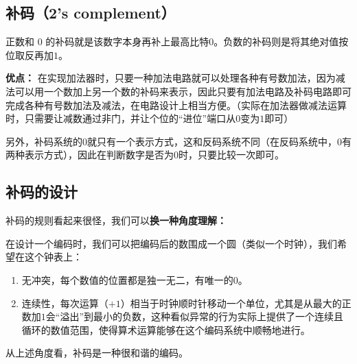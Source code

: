 \subsection{补码（2's complement）}

正数和 $0$ 的补码就是该数字本身再补上最高比特$0$。负数的补码则是将其绝对值按位取反再加$1$。

\textbf{优点：}
在实现加法器时，只要一种加法电路就可以处理各种有号数加法，因为减法可以用一个数加上另一个数的补码来表示，因此只要有加法电路及补码电路即可完成各种有号数加法及减法，在电路设计上相当方便。（实际在加法器做减法运算时，只需要让减数通过非门，并让个位的“进位”端口从$0$变为$1$即可）

另外，补码系统的$0$就只有一个表示方式，这和反码系统不同（在反码系统中，$0$有两种表示方式），因此在判断数字是否为$0$时，只要比较一次即可。


\subsection{补码的设计}

补码的规则看起来很怪，我们可以\textbf{换一种角度理解：}

在设计一个编码时，我们可以把编码后的数围成一个圆（类似一个时钟），我们希望在这个钟表上：
\begin{enumerate}
\item 
无冲突，每个数值的位置都是独一无二，有唯一的$0$。
\item 
连续性，每次运算（$+1$）相当于时钟顺时针移动一个单位，尤其是从最大的正数加$1$会“溢出”到最小的负数，这种看似异常的行为实际上提供了一个连续且循环的数值范围，使得算术运算能够在这个编码系统中顺畅地进行。
\end{enumerate}

从上述角度看，补码是一种很和谐的编码。
